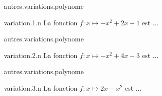 \begin{qcm}{autres.variations.polynome}
    \begin{question}{variation.1.n}
        La fonction $f\colon x\mapsto -x^2+2x+1$ est $\ldots$
        \vspace{0.1cm}
            \begin{reponses}       
                \bonne{décroissante sur $]1,+\infty[$}
                \mauvaise{strictement croissante sur $]1,+\infty[$}
                \mauvaise{croissante sur $[1,+\infty[$}
            \end{reponses}
        \vspace{0.4cm}
    \end{question}
\end{qcm}


\begin{qcm}{autres.variations.polynome}
    \begin{question}{variation.2.n}
        La fonction $f\colon  x\mapsto -x^2+4x-3$ est $\ldots$
        \vspace{0.1cm}
            \begin{reponses}       
                \bonne{décroissante sur $]2,+\infty[$}
                \mauvaise{strictement croissante sur $]2,+\infty[$}
                \mauvaise{croissante sur $[2,+\infty[$}
            \end{reponses}
        \vspace{0.4cm}
    \end{question}
\end{qcm}


\begin{qcm}{autres.variations.polynome}
    \begin{question}{variation.3.n}
        La fonction $f\colon  x\mapsto 2x-x^2$ est $\ldots$
        \vspace{0.1cm}
            \begin{reponses}       
                \bonne{décroissante sur $]1,+\infty[$}
                \mauvaise{strictement croissante sur $]1,+\infty[$}
                \mauvaise{croissante sur $[1,+\infty[$}
                \mauvaise{strictement décroissante sur $]0,+\infty[$}
            \end{reponses}
        \vspace{0.4cm}
    \end{question}
\end{qcm}